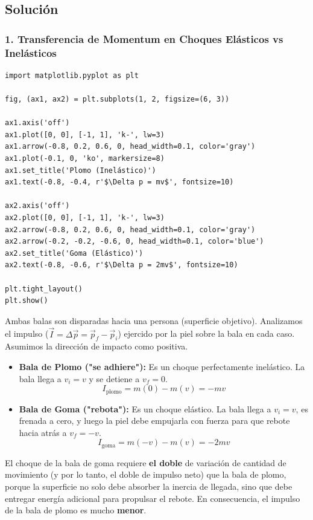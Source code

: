 \documentclass[12pt, a4paper]{article}
\begin{document}
\subsection*{Solución}

\subsubsection*{1. Transferencia de Momentum en Choques Elásticos vs Inelásticos}

\begin{verbatim}
import matplotlib.pyplot as plt

fig, (ax1, ax2) = plt.subplots(1, 2, figsize=(6, 3))

ax1.axis('off')
ax1.plot([0, 0], [-1, 1], 'k-', lw=3)
ax1.arrow(-0.8, 0.2, 0.6, 0, head_width=0.1, color='gray')
ax1.plot(-0.1, 0, 'ko', markersize=8)
ax1.set_title('Plomo (Inelástico)')
ax1.text(-0.8, -0.4, r'$\Delta p = mv$', fontsize=10)

ax2.axis('off')
ax2.plot([0, 0], [-1, 1], 'k-', lw=3)
ax2.arrow(-0.8, 0.2, 0.6, 0, head_width=0.1, color='gray')
ax2.arrow(-0.2, -0.2, -0.6, 0, head_width=0.1, color='blue')
ax2.set_title('Goma (Elástico)')
ax2.text(-0.8, -0.6, r'$\Delta p = 2mv$', fontsize=10)

plt.tight_layout()
plt.show()
\end{verbatim}


Ambas balas son disparadas hacia una persona (superficie objetivo). Analizamos el impulso ($\vec{I} = \Delta\vec{p} = \vec{p}_f - \vec{p}_i$) ejercido por la piel sobre la bala en cada caso. Asumimos la dirección de impacto como positiva.
\begin{itemize}
    \item \textbf{Bala de Plomo ("se adhiere"):} Es un choque perfectamente inelástico. La bala llega a $v_i = v$ y se detiene a $v_f = 0$.
    $$ I_{\text{plomo}} = m(0) - m(v) = -mv $$
    \item \textbf{Bala de Goma ("rebota"):} Es un choque elástico. La bala llega a $v_i = v$, es frenada a cero, y luego la piel debe empujarla con fuerza para que rebote hacia atrás a $v_f = -v$.
    $$ I_{\text{goma}} = m(-v) - m(v) = -2mv $$
\end{itemize}

El choque de la bala de goma requiere \textbf{el doble} de variación de cantidad de movimiento (y por lo tanto, el doble de impulso neto) que la bala de plomo, porque la superficie no solo debe absorber la inercia de llegada, sino que debe entregar energía adicional para propulsar el rebote. En consecuencia, el impulso de la bala de plomo es mucho \textbf{menor}.
\end{document}
